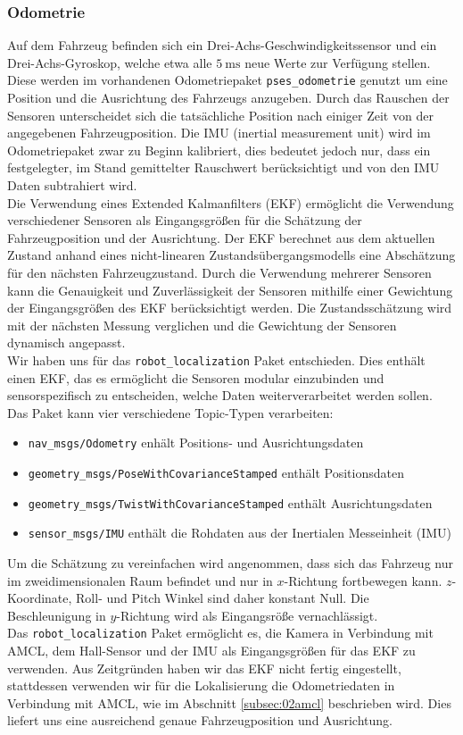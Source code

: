 \subsubsection{Odometrie}
\label{subsec:02odom}
Auf dem Fahrzeug befinden sich ein Drei-Achs-Geschwindigkeitssensor und ein Drei-Achs-Gyroskop, welche etwa alle $\SI{5}{\milli\second}$ neue Werte zur Verf\"ugung stellen. Diese werden im vorhandenen Odometriepaket \texttt{pses\_odometrie} genutzt um eine Position und die Ausrichtung des Fahrzeugs anzugeben. Durch das Rauschen der Sensoren unterscheidet sich die tats\"achliche Position  nach einiger Zeit von der angegebenen Fahrzeugposition. Die IMU (inertial measurement unit) wird im Odometriepaket zwar zu Beginn kalibriert, dies bedeutet jedoch nur, dass ein festgelegter, im Stand gemittelter Rauschwert ber\"ucksichtigt und von den IMU Daten subtrahiert wird.\\
Die Verwendung eines Extended Kalmanfilters (EKF) erm\"oglicht die Verwendung verschiedener Sensoren als Eingangsgr\"o{\ss}en f\"ur die Sch\"atzung der Fahrzeugposition und der Ausrichtung. Der EKF berechnet aus dem aktuellen Zustand anhand eines nicht-linearen Zustands\"ubergangsmodells eine Absch\"atzung f\"ur den n\"achsten Fahrzeugzustand. Durch die Verwendung mehrerer Sensoren kann die Genauigkeit und Zuverl\"assigkeit der Sensoren mithilfe einer Gewichtung der Eingangsgr\"o{\ss}en des EKF ber\"ucksichtigt werden.  Die Zustandssch\"atzung wird mit der n\"achsten Messung verglichen und die Gewichtung der Sensoren dynamisch angepasst.\\
Wir haben uns f\"ur das \texttt{robot\_localization} Paket entschieden. Dies enth\"alt einen EKF, das es erm\"oglicht die Sensoren modular einzubinden und sensorspezifisch zu entscheiden, welche Daten weiterverarbeitet werden sollen.
Das Paket kann vier verschiedene Topic-Typen verarbeiten:
\begin{itemize}
	\item \texttt{nav\_msgs/Odometry} enh\"alt Positions- und Ausrichtungsdaten
	\item \texttt{geometry\_msgs/PoseWithCovarianceStamped} enth\"alt Positionsdaten
	\item \texttt{geometry\_msgs/TwistWithCovarianceStamped} enth\"alt Ausrichtungsdaten
	\item \texttt{sensor\_msgs/IMU} enth\"alt die Rohdaten aus der Inertialen Messeinheit (IMU)
\end{itemize}
Um die Sch\"atzung zu vereinfachen wird angenommen, dass sich das Fahrzeug nur im zweidimensionalen Raum befindet und nur in $x$-Richtung fortbewegen kann. $z$-Koordinate, Roll- und Pitch Winkel sind daher konstant Null. Die Beschleunigung in $y$-Richtung wird als Eingangsr\"o{\ss}e vernachl\"assigt. \\
Das \texttt{robot\_localization} Paket erm\"oglicht es, die Kamera in Verbindung mit  AMCL, dem Hall-Sensor und der IMU als Eingangsgr\"o{\ss}en f\"ur das EKF zu verwenden. Aus Zeitgr\"unden haben wir das EKF nicht fertig eingestellt, stattdessen verwenden wir f\"ur die Lokalisierung die Odometriedaten in Verbindung mit AMCL, wie im Abschnitt \ref{subsec:02amcl} beschrieben wird. Dies liefert uns eine ausreichend genaue Fahrzeugposition und Ausrichtung.
